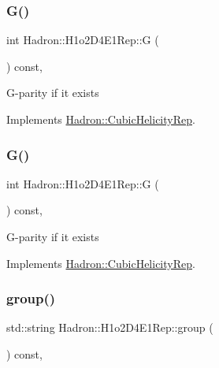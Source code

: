 \subsubsection{\texorpdfstring{G()}{G()}\hspace{0.1cm}{\footnotesize\ttfamily [1/2]}}
{\footnotesize\ttfamily int Hadron\+::\+H1o2\+D4\+E1\+Rep\+::G (\begin{DoxyParamCaption}{ }\end{DoxyParamCaption}) const\hspace{0.3cm}{\ttfamily [inline]}, {\ttfamily [virtual]}}

G-\/parity if it exists 

Implements \mbox{\hyperlink{structHadron_1_1CubicHelicityRep_a50689f42be1e6170aa8cf6ad0597018b}{Hadron\+::\+Cubic\+Helicity\+Rep}}.

\mbox{\label{structHadron_1_1H1o2D4E1Rep_a89d088da502c7cd8faeecc24caebcc97}} 
\subsubsection{\texorpdfstring{G()}{G()}\hspace{0.1cm}{\footnotesize\ttfamily [2/2]}}
{\footnotesize\ttfamily int Hadron\+::\+H1o2\+D4\+E1\+Rep\+::G (\begin{DoxyParamCaption}{ }\end{DoxyParamCaption}) const\hspace{0.3cm}{\ttfamily [inline]}, {\ttfamily [virtual]}}

G-\/parity if it exists 

Implements \mbox{\hyperlink{structHadron_1_1CubicHelicityRep_a50689f42be1e6170aa8cf6ad0597018b}{Hadron\+::\+Cubic\+Helicity\+Rep}}.

\mbox{\label{structHadron_1_1H1o2D4E1Rep_a450bf31aa04b582fae7cf5cdb6c987f7}} 
\subsubsection{\texorpdfstring{group()}{group()}\hspace{0.1cm}{\footnotesize\ttfamily [1/3]}}
{\footnotesize\ttfamily std\+::string Hadron\+::\+H1o2\+D4\+E1\+Rep\+::group (\begin{DoxyParamCaption}{ }\end{DoxyParamCaption}) const\hspace{0.3cm}{\ttfamily [inline]}, {\ttfamily [virtual]}}

